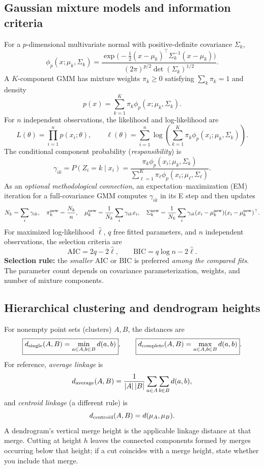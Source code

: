 \subsection{Gaussian mixture models and information criteria}
For a $p$-dimensional multivariate normal with positive-definite covariance $\Sigma_k$,
\[
\phi_p(x;\mu_k,\Sigma_k)=\frac{\exp\!\big(-\tfrac12(x-\mu_k)^\top\Sigma_k^{-1}(x-\mu_k)\big)}{(2\pi)^{p/2}\det(\Sigma_k)^{1/2}}.
\]
A $K$-component GMM has mixture weights $\pi_k\ge0$ satisfying $\sum_k\pi_k=1$ and density
\[
\boxed{p(x)=\sum_{k=1}^{K}\pi_k\phi_p(x;\mu_k,\Sigma_k)}.
\]
For $n$ independent observations, the likelihood and log-likelihood are
\[
L(\theta)=\prod_{i=1}^{n}p(x_i;\theta),\qquad
\ell(\theta)=\sum_{i=1}^{n}\log\left(\sum_{k=1}^{K}\pi_k\phi_p(x_i;\mu_k,\Sigma_k)\right).
\]
The conditional component probability (\emph{responsibility}) is
\[
\boxed{\gamma_{ik}=P(Z_i=k\mid x_i)=\frac{\pi_k\phi_p(x_i;\mu_k,\Sigma_k)}{\sum_{\ell=1}^{K}\pi_\ell\phi_p(x_i;\mu_\ell,\Sigma_\ell)}}.
\]
As an \emph{optional methodological connection}, an expectation--maximization (EM) iteration for a full-covariance GMM computes $\gamma_{ik}$ in its E step and then updates
\[
N_k=\sum_i\gamma_{ik},\quad
\pi_k^{\rm new}=\frac{N_k}{n},\quad
\mu_k^{\rm new}=\frac1{N_k}\sum_i\gamma_{ik}x_i,\quad
\Sigma_k^{\rm new}=\frac1{N_k}\sum_i\gamma_{ik}(x_i-\mu_k^{\rm new})(x_i-\mu_k^{\rm new})^\top.
\]
For maximized log-likelihood $\hat\ell$, $q$ free fitted parameters, and $n$ independent observations, the selection criteria are
\[
\boxed{\mathrm{AIC}=2q-2\hat\ell},\qquad
\boxed{\mathrm{BIC}=q\log n-2\hat\ell}.
\]
\textbf{Selection rule:} the \emph{smaller} AIC or BIC is preferred \emph{among the compared fits}. The parameter count depends on covariance parameterization, weights, and number of mixture components.

\subsection{Hierarchical clustering and dendrogram heights}
For nonempty point sets (clusters) $A,B$, the distances are
\[
\boxed{d_{\rm single}(A,B)=\min_{a\in A,b\in B}d(a,b)},\qquad
\boxed{d_{\rm complete}(A,B)=\max_{a\in A,b\in B}d(a,b)}.
\]
For reference, \emph{average linkage} is
\[
d_{\rm average}(A,B)=\frac1{\left\lvert A\right\rvert\left\lvert B\right\rvert}\sum_{a\in A}\sum_{b\in B}d(a,b),
\]
and \emph{centroid linkage} (a different rule) is
\[
d_{\rm centroid}(A,B)=d(\mu_A,\mu_B).
\]
A dendrogram's vertical merge height is the applicable linkage distance at that merge. Cutting at height $h$ leaves the connected components formed by merges occurring below that height; if a cut coincides with a merge height, state whether you include that merge.



